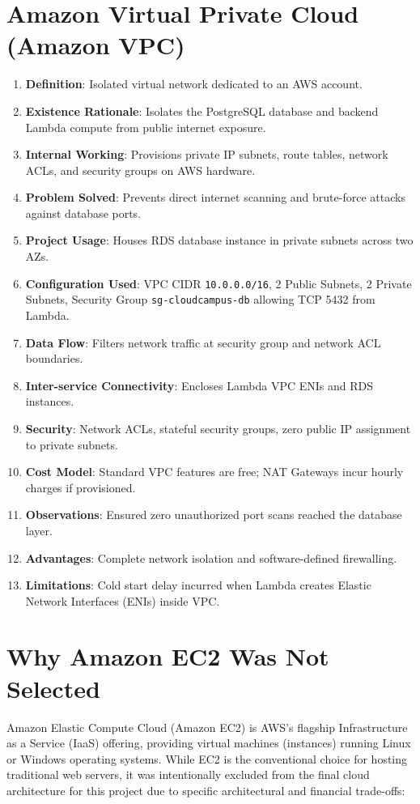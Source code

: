 \section{Amazon Virtual Private Cloud (Amazon VPC)}
\begin{enumerate}
    \item \textbf{Definition}: Isolated virtual network dedicated to an AWS account.
    \item \textbf{Existence Rationale}: Isolates the PostgreSQL database and backend Lambda compute from public internet exposure.
    \item \textbf{Internal Working}: Provisions private IP subnets, route tables, network ACLs, and security groups on AWS hardware.
    \item \textbf{Problem Solved}: Prevents direct internet scanning and brute-force attacks against database ports.
    \item \textbf{Project Usage}: Houses RDS database instance in private subnets across two AZs.
    \item \textbf{Configuration Used}: VPC CIDR \texttt{10.0.0.0/16}, 2 Public Subnets, 2 Private Subnets, Security Group \texttt{sg-cloudcampus-db} allowing TCP 5432 from Lambda.
    \item \textbf{Data Flow}: Filters network traffic at security group and network ACL boundaries.
    \item \textbf{Inter-service Connectivity}: Encloses Lambda VPC ENIs and RDS instances.
    \item \textbf{Security}: Network ACLs, stateful security groups, zero public IP assignment to private subnets.
    \item \textbf{Cost Model}: Standard VPC features are free; NAT Gateways incur hourly charges if provisioned.
    \item \textbf{Observations}: Ensured zero unauthorized port scans reached the database layer.
    \item \textbf{Advantages}: Complete network isolation and software-defined firewalling.
    \item \textbf{Limitations}: Cold start delay incurred when Lambda creates Elastic Network Interfaces (ENIs) inside VPC.
\end{enumerate}

\section{Why Amazon EC2 Was Not Selected}
Amazon Elastic Compute Cloud (Amazon EC2) is AWS's flagship Infrastructure as a Service (IaaS) offering, providing virtual machines (instances) running Linux or Windows operating systems. While EC2 is the conventional choice for hosting traditional web servers, it was intentionally excluded from the final cloud architecture for this project due to specific architectural and financial trade-offs:

